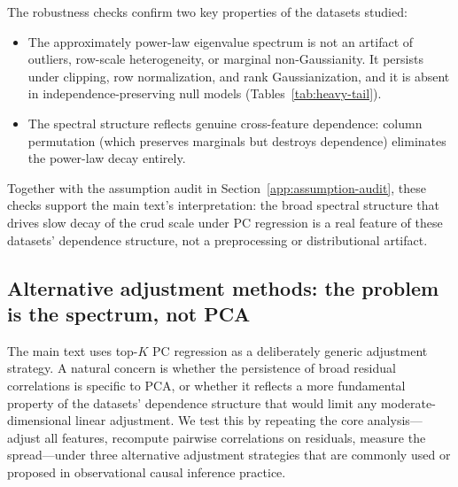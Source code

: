 The robustness checks confirm two key properties of the datasets studied:
\begin{itemize}
\item The approximately power-law eigenvalue spectrum is not an artifact of
  outliers, row-scale heterogeneity, or marginal non-Gaussianity.
  It persists under clipping, row normalization, and rank Gaussianization,
  and it is absent in independence-preserving null models
  (Tables~\ref{tab:heavy-tail}).
\item The spectral structure reflects genuine cross-feature dependence:
  column permutation (which preserves marginals but destroys dependence)
  eliminates the power-law decay entirely.
\end{itemize}
Together with the assumption audit in Section~\ref{app:assumption-audit}, these
checks support the main text's interpretation: the broad spectral structure that
drives slow decay of the crud scale under PC regression is a real feature of
these datasets' dependence structure, not a preprocessing or distributional
artifact.

\subsection{Alternative adjustment methods: the problem is the spectrum, not PCA}
\label{app:alt-adjust}

The main text uses top-$K$ PC regression as a deliberately generic adjustment
strategy. A natural concern is whether the persistence of broad residual
correlations is specific to PCA, or whether it reflects a more fundamental
property of the datasets' dependence structure that would limit any
moderate-dimensional linear adjustment. We test this by repeating the core
analysis---adjust all features, recompute pairwise correlations on residuals,
measure the spread---under three alternative adjustment strategies that are
commonly used or proposed in observational causal inference practice.

